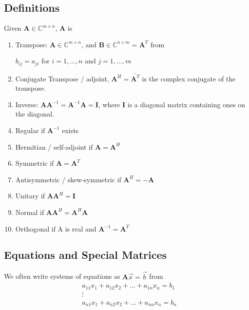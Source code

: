 \documentclass[12pt]{article}
\newcommand{\ve}[1]{\ensuremath{\mathbf{#1}}}
\newcommand{\cc}[1]{\ensuremath{\overline{#1}}}
\begin{document}
\subsection{Definitions}

Given $\ve{A} \in \mathbb{C}^{m \times n}$, \ve{A} is
%
\begin{enumerate}
\item Transpose: $\ve{A} \in \mathbb{C}^{m \times n}$, and $\ve{B} \in \mathbb{C}^{n \times m} = \ve{A}^T$ from

$b_{	ij} = a_{ji}$ for $i = 1, \dots, n$ and $j = 1, \dots, m$

\item Conjugate Transpose / adjoint, $\ve{A}^H = \cc{\ve{A}^T}$ is the complex conjugate of the transpose. 

\item Inverse: $\ve{AA}^{-1} = \ve{A}^{-1}\ve{A} = \ve{I}$, where $\ve{I}$ is a diagonal matrix containing ones on the diagonal.


\item Regular if $\ve{A}^{-1}$ exists

\item Hermitian / self-adjoint if $\ve{A} = \ve{A}^H$

\item Symmetric if $\ve{A} = \ve{A}^T$

\item Antisymmetric / skew-symmetric if $\ve{A}^H = -\ve{A}$

\item Unitary if $\ve{A}\ve{A}^H = \ve{I}$

\item Normal if $\ve{A}\ve{A}^H = \ve{A}^H\ve{A}$

\item Orthogonal if A is real and $\ve{A}^{-1} = \ve{A}^T$ 
\end{enumerate}


\subsection{Equations and Special Matrices}

We often write systems of equations as $\ve{A}\vec{x} = \vec{b}$ from
\begin{align}
&a_{11} x_1 + a_{12} x_2 + \dots + a_{1n} x_n = b_1 \nonumber \\
&\vdots \nonumber \\
&a_{n1} x_1 + a_{n2} x_2 + \dots + a_{nn} x_n = b_n \nonumber
\end{align}
\end{document}
